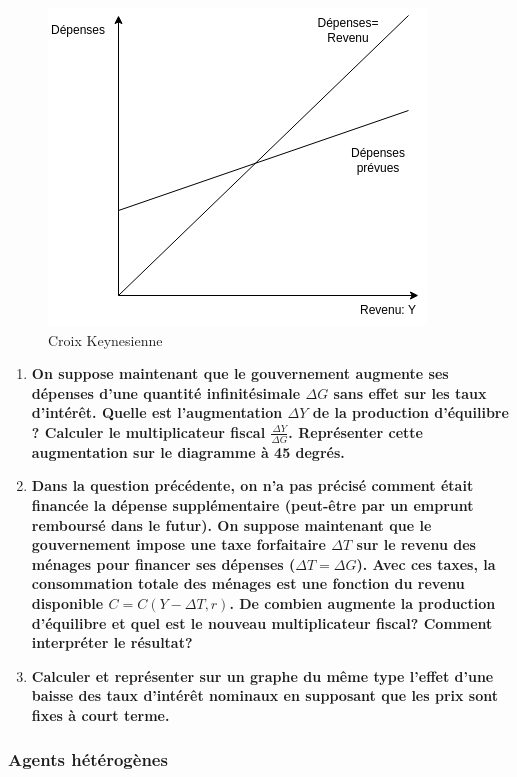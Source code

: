\documentclass[
]{article}
\begin{document}
\begin{figure}
\centering
\includegraphics{cross.png}
\caption{Croix Keynesienne}
\end{figure}

\begin{enumerate}
\def\labelenumi{\arabic{enumi}.}
\setcounter{enumi}{1}
\item
  \textbf{On suppose maintenant que le gouvernement augmente ses
  dépenses d'une quantité infinitésimale \(\Delta G\) sans effet sur les
  taux d'intérêt. Quelle est l'augmentation \(\Delta Y\) de la
  production d'équilibre ? Calculer le multiplicateur fiscal
  \(\frac{\Delta Y}{\Delta G}\). Représenter cette augmentation sur le
  diagramme à 45 degrés.}
\item
  \textbf{Dans la question précédente, on n'a pas précisé comment était
  financée la dépense supplémentaire (peut-être par un emprunt remboursé
  dans le futur). On suppose maintenant que le gouvernement impose une
  taxe forfaitaire \(\Delta T\) sur le revenu des ménages pour financer
  ses dépenses (\(\Delta T=\Delta G\)). Avec ces taxes, la consommation
  totale des ménages est une fonction du revenu disponible
  \(C=C(Y-\Delta T, r)\). De combien augmente la production d'équilibre
  et quel est le nouveau multiplicateur fiscal? Comment interpréter le
  résultat?}
\item
  \textbf{Calculer et représenter sur un graphe du même type l'effet
  d'une baisse des taux d'intérêt nominaux en supposant que les prix
  sont fixes à court terme.}
\end{enumerate}

\hypertarget{agents-huxe9tuxe9roguxe8nes}{%
\subsubsection{Agents hétérogènes}\label{agents-huxe9tuxe9roguxe8nes}}
\end{document}
